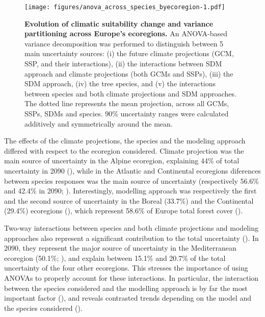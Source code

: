 \documentclass[letterpaper,8pt]{article}  %
\begin{document}
\begin{doublespacing}
\begin{linenumbers}
\begin{figure}[H]
\vspace*{0cm}
\centering
\texttt{[image: figures/anova\_across\_species\_byecoregion-1.pdf]}
\caption{\textbf{Evolution of climatic suitability change and variance partitioning across Europe's ecoregions.} An ANOVA-based variance decomposition was performed to distinguish between 5 main uncertainty sources: (i) the future climate projections (GCM, SSP, and their interactions), (ii) the interactions between SDM approach and climate projections (both GCMs and SSPs), (iii) the SDM approach, (iv) the tree species, and (v) the interactions between species and both climate projections and SDM approaches. The dotted line represents the mean projection, across all GCMs, SSPs, SDMs and species. 90\% uncertainty ranges were calculated additively and symmetrically around the mean.}
\label{fig:anovaecoregions}
\vspace*{0cm}
\end{figure}

The effects of the climate projections, the species  and the modeling approach differed with respect to the ecoregion considered. Climate projection was the main source of uncertainty in the Alpine ecoregion, explaining 44\% of total uncertainty in 2090 (), while in the Atlantic and Continental ecoregions diferences between species responses was the main source of uncertainty (respectively 56.6\% and 42.4\% in 2090; ). Interestingly, modelling approach was respectively the first and the second source of uncertainty in the Boreal (33.7\%) and the Continental (29.4\%) ecoregions (), which represent 58.6\% of Europe total forest cover ().

Two-way interactions between species and both climate projections and modeling approaches also represent a significant contribution to the total uncertainty (). In 2090, they represent the major source of uncertainty in the Mediterranean ecoregion  (50.1\%; ), and explain between 15.1\% and 20.7\% of the total uncertainty of the four other ecoregions. This stresses the importance of using ANOVAs to properly account for these interactions. In particular, the interaction between the species considered and the modelling approach is by far the most important factor (), and reveals contrasted trends depending on the model and the species considered (). 


\end{linenumbers}
\end{doublespacing}
\end{document}
